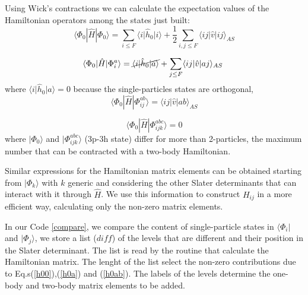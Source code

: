 \documentclass[twoside]{article}
\newcommand{\bra}[1]{\langle #1 |}
\newcommand{\ket}[1]{| #1 \rangle}
\begin{document}
Using Wick's contractions we can calculate the expectation values of the Hamiltonian operators among the states just built:
\begin{equation}\label{h00}
\bra{\Phi_0} \hat H \ket{\Phi_0} = \sum_{i \leq F} \langle i \vert \hat h_0 \vert i \rangle + \frac{1}{2} \sum_{i,j \leq F} \langle i j\vert \hat v \vert ij \rangle_{AS} 
\end{equation}

\begin{equation}\label{h0a}
\bra{\Phi_0} \hat H \ket{\Phi_i^a} =  \cancel{\langle i \vert \hat h_0 \vert a \rangle} +  \sum_{j \leq F} \langle i j\vert \hat v \vert aj \rangle_{AS} \; 
\end{equation}
where ${\langle i \vert \hat h_0 \vert a \rangle}=0$ because the single-particles states are orthogonal,
\begin{equation}\label{h0ab}
\bra{\Phi_0} \hat H \ket{\Phi_{ij}^{ab}} =  \langle i j\vert \hat v \vert ab \rangle_{AS}
\end{equation}

\begin{equation}
\bra{\Phi_0} \hat H \ket{\Phi_{ijk}^{abc}} = 0
\end{equation}
where $\ket{\Phi_0}$ and $\ket{\Phi_{ijk}^{abc}}$ (3p-3h state) differ for more than 2-particles, the maximum number that can be contracted with a two-body Hamiltonian.

Similar expressions for the Hamiltonian matrix elements can be obtained starting from $\ket{\Phi_k}$ with $k$ generic and considering the other Slater determinants that can interact with it through $\hat H$. We use this information to construct $H_{ij}$ in a more efficient way, calculating only the non-zero matrix elements.

In our Code \ref{compare}, we compare the content of single-particle states in $\bra{\Phi_i}$ and $\ket{\Phi_j}$, we store a list ($diff$) of the levels that are different and their position in the Slater determinant. The list is read by the routine that calculate the Hamiltonian matrix. The lenght of the list select the non-zero contributions due to Eq.s(\ref{h00}),(\ref{h0a}) and (\ref{h0ab}). The labels of the levels determine the one-body and two-body matrix elements to be added. 
\end{document}
